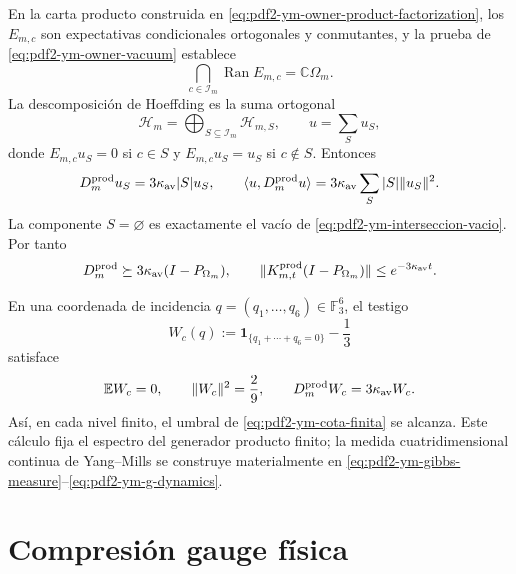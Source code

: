En la carta producto construida en
\eqref{eq:pdf2-ym-owner-product-factorization}, los $E_{m,c}$ son expectativas
condicionales ortogonales y conmutantes, y la prueba de
\eqref{eq:pdf2-ym-owner-vacuum} establece
\begin{equation}\label{eq:pdf2-ym-interseccion-vacio}
 \bigcap_{c\in\mathcal I_m}\operatorname{Ran}E_{m,c}
 =\mathbb C\Omega_m.
\end{equation}
La descomposición de Hoeffding es la suma ortogonal
\[
 \mathcal H_m=\bigoplus_{S\subseteq\mathcal I_m}\mathcal H_{m,S},
 \qquad u=\sum_Su_S,
\]
donde $E_{m,c}u_S=0$ si $c\in S$ y $E_{m,c}u_S=u_S$ si $c\notin S$.
Entonces
\begin{equation}\label{eq:pdf2-ym-hoeffding}
 D_m^{\rm prod}u_S=3\kappa_{\rm av}|S|u_S,
 \qquad
 \langle u,D_m^{\rm prod}u\rangle
 =3\kappa_{\rm av}\sum_S|S|\|u_S\|^2.
\end{equation}
La componente $S=\varnothing$ es exactamente el vacío de
\eqref{eq:pdf2-ym-interseccion-vacio}. Por tanto
\begin{equation}\label{eq:pdf2-ym-cota-finita}
 D_m^{\rm prod}\succeq
 3\kappa_{\rm av}(I-P_{\Omega_m}),
 \qquad
 \|K^{\rm prod}_{m,t}(I-P_{\Omega_m})\|
 \le e^{-3\kappa_{\rm av}t}.
\end{equation}

En una coordenada de incidencia
$q=(q_1,\ldots,q_6)\in\mathbb F_3^6$, el testigo
\begin{equation}\label{eq:pdf2-ym-wc}
 W_c(q):=\mathbf1_{\{q_1+\cdots+q_6=0\}}-\frac13
\end{equation}
satisface
\begin{equation}\label{eq:pdf2-ym-wc-momentos}
 \mathbb EW_c=0,\qquad \|W_c\|^2=\frac29,\qquad
 D_m^{\rm prod}W_c=3\kappa_{\rm av}W_c.
\end{equation}
Así, en cada nivel finito, el umbral de
\eqref{eq:pdf2-ym-cota-finita} se alcanza. Este cálculo fija el espectro del
generador producto finito; la medida cuatridimensional continua de Yang--Mills se
construye materialmente en
\eqref{eq:pdf2-ym-gibbs-measure}--\eqref{eq:pdf2-ym-g-dynamics}.

\section{Compresión gauge física}

